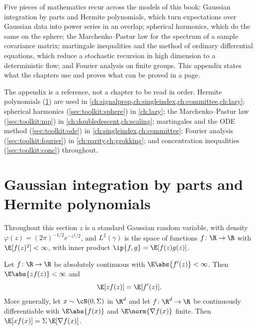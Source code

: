 \begin{refsection}

\begin{chaptersummary}
Five pieces of mathematics recur across the models of this book: Gaussian integration by parts and Hermite polynomials, which turn expectations over Gaussian data into power series in an overlap; spherical harmonics, which do the same on the sphere; the Marchenko--Pastur law for the spectrum of a sample covariance matrix; martingale inequalities and the method of ordinary differential equations, which reduce a stochastic recursion in high dimension to a deterministic flow; and Fourier analysis on finite groups. This appendix states what the chapters use and proves what can be proved in a page.
\end{chaptersummary}

The appendix is a reference, not a chapter to be read in order. Hermite polynomials (\cref{sec:toolkit:hermite}) are used in \cref{ch:signalprop,ch:singleindex,ch:committee,ch:lazy}; spherical harmonics (\cref{sec:toolkit:sphere}) in \cref{ch:lazy}; the Marchenko--Pastur law (\cref{sec:toolkit:mp}) in \cref{ch:doubledescent,ch:scaling}; martingales and the ODE method (\cref{sec:toolkit:ode}) in \cref{ch:singleindex,ch:committee}; Fourier analysis (\cref{sec:toolkit:fourier}) in \cref{ch:parity,ch:grokking}; and concentration inequalities (\cref{sec:toolkit:conc}) throughout.

\section{Gaussian integration by parts and Hermite polynomials}\label{sec:toolkit:hermite}

Throughout this section $z$ is a standard Gaussian random variable, with density $\varphi(z)=(2\pi)^{-1/2}e^{-z^2/2}$, and $L^2(\gamma)$ is the space of functions $f\colon\R\to\R$ with $\E[f(z)^2]<\infty$, with inner product $\ip{f,g}=\E[f(z)g(z)]$.

\begin{theorem}\label{thm:toolkit:stein}
Let $f\colon\R\to\R$ be absolutely continuous with $\E\abs{f'(z)}<\infty$. Then $\E\abs{zf(z)}<\infty$ and
\[
  \E[zf(z)]=\E[f'(z)].
\]
More generally, let $x\sim\cN(0,\Sigma)$ in $\R^d$ and let $f\colon\R^d\to\R$ be continuously differentiable with $\E\abs{f(x)}$ and $\E\norm{\nabla f(x)}$ finite. Then $\E[x f(x)]=\Sigma\,\E[\nabla f(x)]$.
\end{theorem}


\end{refsection}

